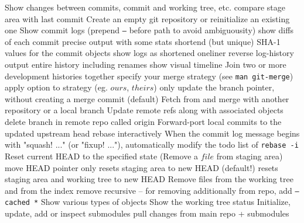 	{Show changes between commits, commit and working tree, etc.}
	{compare stage area with last commit}
	{Create an empty git repository or reinitialize an existing one}
	{Show commit logs (prepend {\tt --} before path to avoid ambiguousity)}
	{show diffs of each commit}
	{precise output with some stats}
	{shortend (but unique) SHA-1 values for the commit objects }
	{show logs as shortened oneliner}
	{reverse log-history output}
	{entire history including renames}
	{show visual timeline}
	{Join two or more development histories together}
	{specify your merge strategy (see {\tt man git-merge})}
	{apply option to strategy (eg. $ours$, $theirs$)}
	{only update the branch pointer, without creating a merge commit (default)}
	{Fetch from and merge with another re\-pository or a local branch}
	{Update remote refs along with associated objects}
	{delete branch in remote repo called origin}
	{Forward-port local commits to the updated upstream head}
	{rebase interactively}
	{When the commit log message begins with "squash! ..." (or "fixup! ..."), automatically modify the todo list of {\tt rebase -i} }
	{Reset current HEAD to the specified state (Remove a $file$ from staging area)}
	{move HEAD pointer only}
	{resets staging area to new HEAD (default!)}
	{resets staging area and working tree to new HEAD}
	{Remove files from the working tree and from the index}
	{remove recursive -- for removing additionally from repo, add
{\tt --cached *}}
	{Show various types of objects}
	{Show the working tree status}
	{Initialize, update, add or inspect submodules}
	{pull changes from main repo + submodules}

